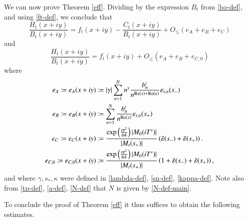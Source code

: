 We can now prove Theorem \ref{eff}.  Dividing by the expression $B_t$ from \eqref{bo-def}, and using \eqref{ft-def}, we conclude that
\begin{equation}\label{ratio-form-refined}
\frac{H_t(x+iy)}{B_t(x+iy)} = f_t(x+iy) - \frac{C_t(x+iy)}{B_t(x+iy)} + O_{\leq}\left( e_A + e_B + e_{C} \right)
\end{equation}
and
\begin{equation}\label{ratio-form}
\frac{H_t(x+iy)}{B_t(x+iy)} = f_t(x+iy) + O_{\leq}\left( e_A + e_B + e_{C,0} \right)
\end{equation}
where
\begin{align}
e_A \coloneqq e_A(x+iy) &\coloneqq |\gamma| \sum_{n=1}^N n^y \frac{b_n^t}{n^{\mathrm{Re}(s) + \mathrm{Re}(\kappa)}} \varepsilon_{t,n}(s_-) \label{ea-def}\\
e_B \coloneqq e_B(x+iy) &\coloneqq \sum_{n=1}^N  \frac{b_n^t}{n^{\mathrm{Re}(s)}} \varepsilon_{t,n}(s_+) \label{eb-def} \\
e_{C} \coloneqq e_{C}(x+iy) &\coloneqq \frac{\exp\left( \frac{t \pi^2}{64}\right) |M_0(iT')|}{|M_t(s_+)|} \left(\tilde {\varepsilon}(s_-) + \tilde {\varepsilon}(s_+)\right).\label{ecc-def}\\
e_{C,0} \coloneqq e_{C,0}(x+iy) &\coloneqq \frac{\exp\left( \frac{t \pi^2}{64}\right) |M_0(iT')|}{|M_t(s_+)|} \left(1 + \tilde {\varepsilon}(s_-) + \tilde {\varepsilon}(s_+) \right),\label{ec-def}
\end{align}
and where $\gamma,s_*,\kappa$ were defined in \eqref{lambda-def}, \eqref{sn-def}, \eqref{kappa-def}.  Note also from \eqref{tp-def}, \eqref{a-def}, \eqref{N-def} that $N$ is given by \eqref{N-def-main}.

To conclude the proof of Theorem \ref{eff} it thus suffices to obtain the following estimates.


